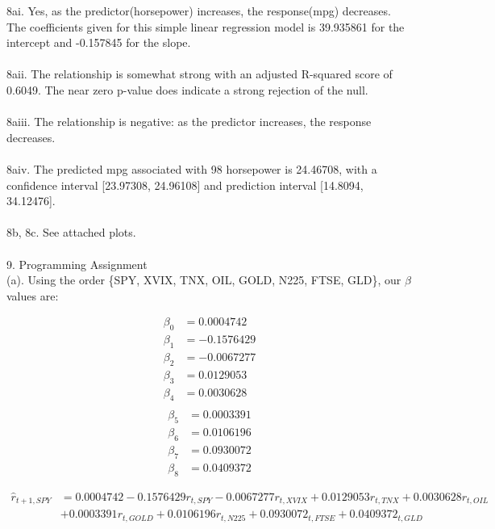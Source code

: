 \documentclass[12pt]{article}
\begin{document}
8ai. Yes, as the predictor(horsepower) increases, the response(mpg) decreases. The coefficients given for this simple linear regression model is 39.935861 for the intercept and -0.157845 for the slope.
\\ \\
8aii. The relationship is somewhat strong with an adjusted R-squared score of 0.6049. The near zero p-value does indicate a strong rejection of the null.
\\ \\
8aiii. The relationship is negative: as the predictor increases, the response decreases.
\\ \\
8aiv. The predicted mpg associated with 98 horsepower is 24.46708, with a confidence interval [23.97308, 24.96108] and prediction interval [14.8094, 34.12476].
\\ \\
8b, 8c. See attached plots.
\\ \\
9. Programming Assignment
\\
(a). Using the order \{SPY, XVIX, TNX, OIL, GOLD, N225, FTSE, GLD\}, our $\beta$ values are:
\begin{multicols}{2}
\begin{align} \nonumber
\beta_0 &= 0.0004742 \\ \nonumber
\beta_1 &= -0.1576429 \\ \nonumber
\beta_2 &= -0.0067277 \\ \nonumber
\beta_3 &= 0.0129053 \\ \nonumber
\beta_4 &= 0.0030628
\end{align}
\columnbreak
\begin{align} \nonumber
\\ \nonumber
\beta_5 &= 0.0003391 \\ \nonumber
\beta_6 &= 0.0106196 \\ \nonumber
\beta_7 &= 0.0930072 \\ \nonumber
\beta_8 &= 0.0409372
\end{align}
\end{multicols}
\begin{align} \nonumber
\hat{r}_{t+1,SPY} &= 0.0004742 - 0.1576429r_{t,SPY} - 0.0067277r_{t,XVIX} + 0.0129053r_{t,TNX} + 0.0030628r_{t,OIL} \\ \nonumber
 &+ 0.0003391r_{t,GOLD} + 0.0106196r_{t,N225} + 0.0930072_{t,FTSE} + 0.0409372_{t,GLD}
\end{align}
\\
\end{document}
